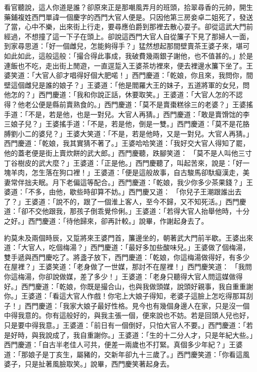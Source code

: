 \begin{showcontents}{}
看官聽說，這人你道是誰？卻原來正是那嘲風弄月的班頭，拾翠尋香的元帥，開生藥鋪複姓西門單諱一個慶字的西門大官人便是。只因他第三房妾卓二姐死了，發送了當，心中不樂，出來街上行走，要尋應伯爵到那裡去散心耍子。卻從這武大門前經過，不想撞了這一下子在頭上。卻說這西門大官人自從簾子下見了那婦人一面，到家尋思道：「好一個雌兒，怎能夠得手？」猛然想起那間壁賣茶王婆子來，堪可如此如此，這般這般：「撮合得此事成，我破費幾兩銀子謝他，也不值甚的。」於是連飯也不吃，走出街上閒遊，一直逕踅入王婆茶坊裡來，便去裡邊水簾下坐了。王婆笑道：「大官人卻才唱得好個大肥喏！」西門慶道：「乾娘，你且來，我問你，間壁這個雌兒是誰的娘子？」王婆道：「他是閻羅大王的妹子，五道將軍的女兒，問他怎的？」西門慶道：「我和你說正話，休要取笑。」王婆道：「大官人怎的不認得？他老公便是縣前賣熟食的。」西門慶道：「莫不是賣棗糕徐三的老婆？」王婆搖手道：「不是，若是他，也是一對兒。大官人再猜。」西門慶道：「敢是賣馉饳的李三娘子兒？」王婆搖手道：「不是，若是他，倒是一雙。」西門慶道：「莫不是花胳膊劉小二的婆兒？」王婆大笑道：「不是，若是他時，又是一對兒。大官人再猜。」西門慶道：「乾娘，我其實猜不著了。」王婆哈哈笑道：「我好交大官人得知了罷，他的蓋老便是街上賣炊餅的武大郎。」西門慶聽，跌腳笑道： 「莫不是人叫他三寸丁谷樹皮的武大麼？」王婆道：「正是他。」西門慶聽了，叫起苦來，說是：「好一塊羊肉，怎生落在狗口裡！」王婆道：「便是這般故事，自古駿馬卻馱癡漢走，美妻常伴拙夫眠。月下老偏這等配合。」西門慶道：「乾娘，我少你多少茶果錢？」王婆道：「不多，由他，歇些時卻算不妨。」西門慶又道： 「你兒子王潮跟誰出去了？」王婆道：「說不的，跟了一個淮上客人，至今不歸，又不知死活。」西門慶道：「卻不交他跟我，那孩子倒乖覺伶俐。」王婆道：「若得大官人抬舉他時，十分之好。」西門慶道：「待他歸來，卻再計較。」說畢，作謝起身去了。

約莫未及兩個時辰，又踅將來王婆門首，簾邊坐的，朝著武大門前半歇。王婆出來道：「大官人，吃個梅湯？」西門慶道：「最好多加些酸味兒。」王婆做了個梅湯，雙手遞與西門慶吃了。將盞子放下，西門慶道：「乾娘，你這梅湯做得好，有多少在屋裡？」王婆笑道：「老身做了一世媒，那討不在屋裡！」西門慶笑道： 「我問你這梅湯，你卻說做媒，差了多少！」王婆道：「老身只聽得大官人問這媒做得好。」西門慶道：「乾娘，你既是撮合山，也與我做頭媒，說頭好親事，我自重重謝你。」王婆道：「看這大官人作戲！你宅上大娘子得知，老婆子這臉上怎吃得那耳刮子！」西門慶道：「我家大娘子最好性格。見今也有幾個身邊人在家，只是沒一個中得我意的。你有這般好的，與我主張一個，便來說也不妨。若是回頭人兒也好，只是要中得我意。」王婆道：「前日有一個倒好，只怕大官人不要。」西門慶道：「若是好時，與我說成了，我自重謝你。」王婆道：「生的十二分人才，只是年紀大些。」西門慶道：「自古半老佳人可共，便差一兩歲也不打緊。真個多少年紀？」王婆道：「那娘子是丁亥生，屬豬的，交新年卻九十三歲了。」西門慶笑道：「你看這風婆子，只是扯著風臉取笑。」說畢，西門慶笑著起身去。


\end{showcontents}
